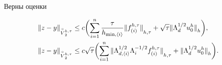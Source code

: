 \begin{lem} Верны оценки


\begin{align}


{\ver z-y \ver}_{\overset{\circ}{V}{}_2^{h,\tau}} &\le c\biggl(


\sum_{i=1}^n\frac{\tau}{h_{\min,\langle i\rangle}}


{\ver f_{(i)}^{h,\tau}\ver}_{h,\tau}+\sqrt\tau{\ver\Lambda_d^{1/2}


u_0^h\ver}_{h}\biggr),\\


%


{\ver z-y \ver}_{\overset{\circ}{V}{}_2^{h,\tau}} &\le c\sqrt\tau


\biggl(


\sum_{i=1}^n{\ver\Lambda_{d,\langle i \rangle}^{1/2}\Lambda_i^{-1/2}f_{(i)}^{h,\tau}


\ver}_{h,\tau}+{\ver\Lambda_d^{1/2}u_0^h\ver}_{h}\biggr).


\end{align}


\end{lem}





